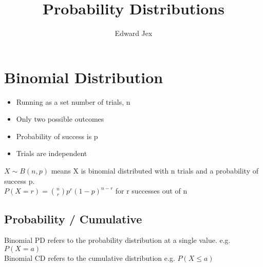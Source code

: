 \documentclass[a4paper,12pt]{article}
\begin{document}
\title{Probability Distributions}	
\author{Edward Jex}
\maketitle
\section*{Binomial Distribution}
\begin{itemize}
	\item Running as a set number of trials, n
	\item Only two possible outcomes
	\item Probability of success is p
	\item Trials are independent
\end{itemize}
$X \sim B(n,p)$ means X is binomial distributed with n trials and a probability of success p. \\
$P(X=r) = \binom{n}{r}p^r(1-p)^{n-r}$ for r successes out of n

\subsection*{Probability / Cumulative }
Binomial PD refers to the probability distribution at a single value. e.g. $P(X=a)$ \\
Binomial CD refers to the cumulative distribution e.g. $P(X \leqslant a)$\\
\end{document}
